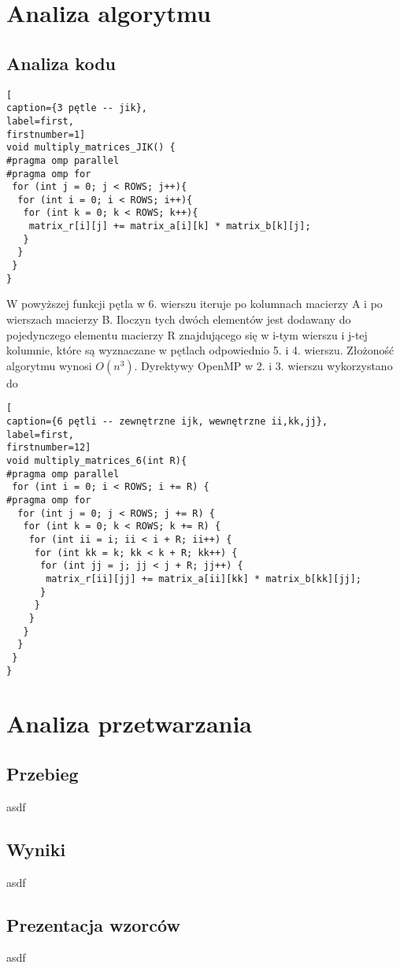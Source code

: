 \documentclass{article}
\begin{document}
\section{Analiza algorytmu}
\subsection{Analiza kodu}
\begin{lstlisting}[
caption={3 pętle -- jik},
label=first,
firstnumber=1]
void multiply_matrices_JIK() {
#pragma omp parallel
#pragma omp for 
 for (int j = 0; j < ROWS; j++){
  for (int i = 0; i < ROWS; i++){
   for (int k = 0; k < ROWS; k++){
    matrix_r[i][j] += matrix_a[i][k] * matrix_b[k][j];
   }
  }
 }
}
\end{lstlisting}
W powyższej funkcji pętla w 6. wierszu iteruje po kolumnach macierzy A i po wierszach macierzy B. Iloczyn tych dwóch elementów jest dodawany do pojedynczego elementu macierzy R znajdującego się w i-tym wierszu i j-tej kolumnie, które są wyznaczane w pętlach odpowiednio 5. i 4. wierszu. Złożoność algorytmu wynosi $O(n^3)$. Dyrektywy OpenMP w 2. i 3. wierszu wykorzystano do 
\begin{lstlisting}[
caption={6 pętli -- zewnętrzne ijk, wewnętrzne ii,kk,jj},
label=first,
firstnumber=12]
void multiply_matrices_6(int R){
#pragma omp parallel
 for (int i = 0; i < ROWS; i += R) {
#pragma omp for
  for (int j = 0; j < ROWS; j += R) {
   for (int k = 0; k < ROWS; k += R) {
    for (int ii = i; ii < i + R; ii++) {
     for (int kk = k; kk < k + R; kk++) {
      for (int jj = j; jj < j + R; jj++) {
       matrix_r[ii][jj] += matrix_a[ii][kk] * matrix_b[kk][jj];
      }
     }
    }
   }
  }
 }	
}
\end{lstlisting}



\section{Analiza przetwarzania}
\subsection{Przebieg}
asdf
\subsection{Wyniki}
asdf
\subsection{Prezentacja wzorców}
asdf
\end{document}
